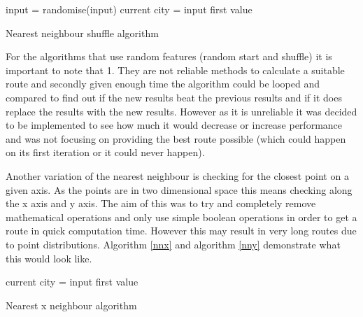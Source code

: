 \documentclass[conference,backref=page]{acmsiggraph}
\begin{document}
\begin{algorithm}[h]	
	input = randomise(input)
	current city = input first value\\
	\caption{Nearest neighbour shuffle algorithm}
\end{algorithm}

For the algorithms that use random features (random start and shuffle) it is important to note that 1. They are not reliable methods to calculate a suitable route and secondly given enough time the algorithm could be looped and compared to find out if the new results beat the previous results and if it does replace the results with the new results. However as it is unreliable it was decided to be implemented to see how much it would decrease or increase performance and was not focusing on providing the best route possible (which could happen on its first iteration or it could never happen). 


Another variation of the nearest neighbour is checking for the closest point on a given axis. As the points are in two dimensional space this means checking along the x axis and y axis. The aim of this was to try and completely remove mathematical operations and only use simple boolean operations in order to get a route in quick computation time. However this may result in very long routes due to point distributions. Algorithm \ref{nnx} and algorithm \ref{nny} demonstrate what this would look like.

\begin{algorithm}[h]
	current city = input first value\\
	\caption{Nearest x neighbour algorithm}
	\label{nnx}
\end{algorithm}
\end{document}
